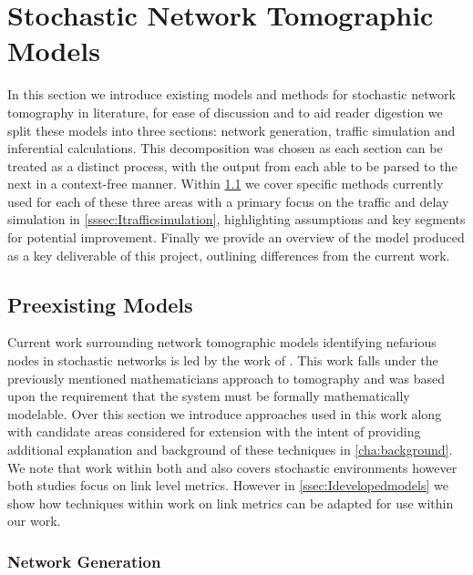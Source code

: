 \newpage
\section{Stochastic Network Tomographic Models}
\label{sec:Imodels}

In this section we introduce existing models and methods for stochastic network tomography in literature, for ease of discussion and to aid reader digestion we split these models into three sections: network generation, traffic simulation and inferential calculations. This decomposition was chosen as each section can be treated as a distinct process, with the output from each able to be parsed to the next in a context-free manner. Within \cref{ssec:Icurrentmodels} we cover specific methods currently used for each of these three areas with a primary focus on the traffic and delay simulation in \cref{sssec:Itrafficsimulation}, highlighting assumptions and key segments for potential improvement. Finally we provide an overview of the model produced as a key deliverable of this project, outlining differences from the current work.

\subsection{Preexisting Models}
\label{ssec:Icurrentmodels}

Current work surrounding network tomographic models identifying nefarious nodes in stochastic networks is led by the work of \cite{barnes_stochastic_2020}. This work falls under the previously mentioned mathematicians approach to tomography and was based upon the requirement that the system must be formally mathematically modelable. Over this section we introduce approaches used in this work along with candidate areas considered for extension with the intent of providing additional explanation and background of these techniques in \cref{cha:background}. We note that work within both \cite{he_fisher_2015} and \cite{kolar_distributed_2020} also covers stochastic environments however both studies focus on link level metrics. However in \cref{ssec:Idevelopedmodels} we show how techniques within work on link metrics can be adapted for use within our work.

\subsubsection*{Network Generation}
\label{sssec:Inetworkgeneration}

